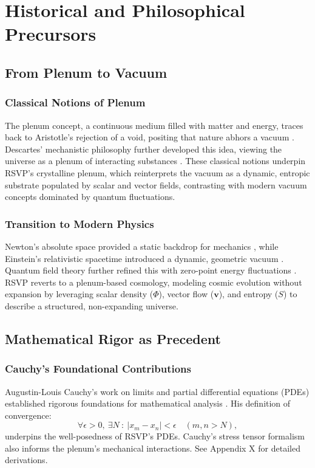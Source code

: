 \documentclass[12pt]{report}
\newcommand{\PhiRSVP}{\Phi}
\newcommand{\vRSVP}{\mathbf{v}}
\newcommand{\SRSVP}{S}
\begin{document}
\part{Historical and Philosophical Precursors}

\chapter{From Plenum to Vacuum}
\section{Classical Notions of Plenum}
The plenum concept, a continuous medium filled with matter and energy, traces back to Aristotle’s rejection of a void, positing that nature abhors a vacuum \citep{AristotlePhysics}. Descartes’ mechanistic philosophy further developed this idea, viewing the universe as a plenum of interacting substances \citep{Descartes1644}. These classical notions underpin RSVP’s crystalline plenum, which reinterprets the vacuum as a dynamic, entropic substrate populated by scalar and vector fields, contrasting with modern vacuum concepts dominated by quantum fluctuations.

\section{Transition to Modern Physics}
Newton’s absolute space provided a static backdrop for mechanics \citep{Newton1687}, while Einstein’s relativistic spacetime introduced a dynamic, geometric vacuum \citep{Einstein1915}. Quantum field theory further refined this with zero-point energy fluctuations \citep{Dirac1930}. RSVP reverts to a plenum-based cosmology, modeling cosmic evolution without expansion by leveraging scalar density (\(\PhiRSVP\)), vector flow (\(\vRSVP\)), and entropy (\(\SRSVP\)) to describe a structured, non-expanding universe.

\chapter{Mathematical Rigor as Precedent}
\section{Cauchy’s Foundational Contributions}
Augustin-Louis Cauchy’s work on limits and partial differential equations (PDEs) established rigorous foundations for mathematical analysis \citep{Cauchy1821}. His definition of convergence:
\begin{equation}
\forall \epsilon > 0, \ \exists N \ : \ |x_m - x_n| < \epsilon \quad (m, n > N), \label{eq:cauchy}
\end{equation}
underpins the well-posedness of RSVP’s PDEs. Cauchy’s stress tensor formalism also informs the plenum’s mechanical interactions. See Appendix X for detailed derivations.
\end{document}
